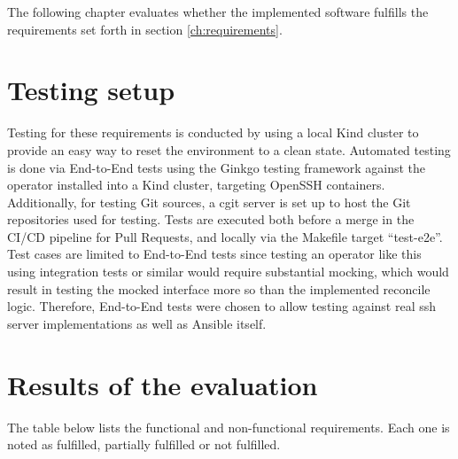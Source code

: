 The following chapter evaluates whether the implemented software fulfills the requirements set forth in section \ref{ch:requirements}.

\section{Testing setup}
Testing for these requirements is conducted by using a local Kind cluster to provide an easy way to reset the environment to a clean state.
Automated testing is done via End-to-End tests using the Ginkgo testing framework against the operator installed into a Kind cluster, targeting OpenSSH containers.
Additionally, for testing Git sources, a cgit server is set up to host the Git repositories used for testing.
Tests are executed both before a merge in the CI/CD pipeline for Pull Requests, and locally via the Makefile target \enquote{test-e2e}.
Test cases are limited to End-to-End tests since testing an operator like this using integration tests or similar would require substantial mocking, which would result in testing the mocked interface more so than the implemented reconcile logic.
Therefore, End-to-End tests were chosen to allow testing against real \gls{ssh} server implementations as well as Ansible itself.

\section{Results of the evaluation}
The table below lists the functional and non-functional requirements.
Each one is noted as fulfilled, partially fulfilled or not fulfilled.

